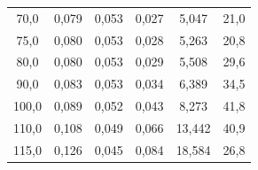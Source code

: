 \documentclass[a4paper, czech]{article}
\begin{document}
\begin{table}[H]
\begin{tabular}{cccccc}
        70,0       & 0,079                                                                       & 0,053                                                                       & 0,027                                                                 & 5,047                                                          & 21,0                                                          \\
        75,0       & 0,080                                                                       & 0,053                                                                       & 0,028                                                                 & 5,263                                                          & 20,8                                                          \\
        80,0       & 0,080                                                                       & 0,053                                                                       & 0,029                                                                 & 5,508                                                          & 29,6                                                          \\
        90,0       & 0,083                                                                       & 0,053                                                                       & 0,034                                                                 & 6,389                                                          & 34,5                                                          \\
        100,0      & 0,089                                                                       & 0,052                                                                       & 0,043                                                                 & 8,273                                                          & 41,8                                                          \\
        110,0      & 0,108                                                                       & 0,049                                                                       & 0,066                                                                 & 13,442                                                         & 40,9                                                          \\
        115,0      & 0,126                                                                       & 0,045                                                                       & 0,084                                                                 & 18,584                                                         & 26,8                                                          \\

\end{tabular}
\end{table}
\end{document}
